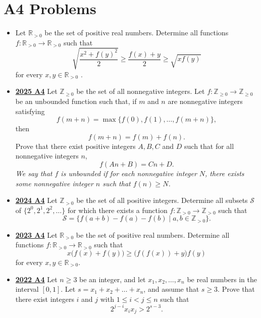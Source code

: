 \documentclass[11pt]{scrartcl}
\begin{document}
\section*{A4 Problems} \label{A4}
 \begin{itemize}[leftmargin=*]

\item {} Let $\mathbb{R}_{>0}$ be the set of positive real numbers. Determine all functions $f :\mathbb{R}_{>0}\to \mathbb{R}_{>0}$ such that
\[\sqrt{\frac{x^2 + f(y)^2}2}\geqslant \frac{f(x) + y}2 \geqslant \sqrt{xf(y)}\]
for every $x ,y\in\mathbb{R}_{>0}$ .

\item \href{https://artofproblemsolving.com/community/c6h3866883p38677019}{\textbf{2025 A4}} Let $\mathbb{Z}_{\geqslant 0}$ be the set of all nonnegative integers. Let $f:\mathbb{Z}_{\geqslant 0}\rightarrow\mathbb{Z}_{\geqslant 0}$ be an unbounded function such that, if $m$ and $n$ are nonnegative integers satisfying
\[ f(m+n)=\max\{f(0),f(1),\dots,f(m+n)\}, \]then
\[ f(m+n)=f(m)+f(n). \]Prove that there exist positive integers $A, B, C$ and $D$ such that for all nonnegative integers $n$,
\[ f(An+B)=Cn+D. \]
\textit{We say that $f$ is unbounded if for each nonnegative integer $N$, there exists some nonnegative integer $n$ such that $f(n)\geqslant N$.}
\item \href{https://artofproblemsolving.com/community/c6h3610435p35340902}{\textbf{2024 A4}} Let \(\mathbb{Z}_{>0}\) be the set of all positive integers. Determine all subsets \(\mathcal{S}\) of \(\{2^{0},2^{1},2^{2},\dots\}\) for which there exists a function \(f\colon\mathbb{Z}_{>0}\to\mathbb{Z}_{>0}\) such that
\[\mathcal{S}=\{f(a+b)-f(a)-f(b)\mid a,b\in\mathbb{Z}_{>0}\}.\]
\item \href{https://artofproblemsolving.com/community/c6h3359742p31218446}{\textbf{2023 A4}} Let $\mathbb R_{>0}$ be the set of positive real numbers. Determine all functions $f \colon \mathbb R_{>0} \to \mathbb R_{>0}$ such that\[x \big(f(x) + f(y)\big) \geqslant  \big(f(f(x)) + y\big) f(y)\]for every $x, y \in \mathbb R_{>0}$.
\item \href{https://artofproblemsolving.com/community/c6h3107365p28104481}{\textbf{2022 A4}} Let $n \geqslant  3$ be an integer, and let $x_1,x_2,\dots,x_n$ be real numbers in the interval $[0,1]$. Let $s=x_1+x_2+\dots+x_n$, and assume that $s \geqslant  3$. Prove that there exist integers $i$ and $j$ with $1 \leqslant i<j \leqslant n$ such that\[2^{j-i}x_ix_j>2^{s-3}.\]

\end{itemize}
\end{document}
